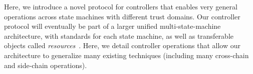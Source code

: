 \documentclass[a4paper,USenglish,cleveref, autoref, thm-restate, anonymous]{lipics-v2021}
\newcommand{\colort}[2]{{\color{#1}{#2}}}
\newcommand{\blue}[1]{\colort{blue}{#1}}
\newcommand{\purple}[1]{{\colort{purple}{#1}}}
\newcommand{\basecoin}{\blue{BaseCoin}}
\newcommand{\basechain}{\blue{BaseChain}}
\newcommand{\sidechain}{\purple{SideChain}}
\begin{document}
Here, we introduce a novel protocol for controllers that enables very general operations across state machines with different trust domains.
Our controller protocol will eventually be part of a larger unified multi-state-machine architecture, with standards for each state machine, as well as transferable objects called \emph{resources}~\cite{resource}.
Here, we detail controller operations that allow our architecture to generalize many existing techniques (including many cross-chain and side-chain operations). 




\end{document}

